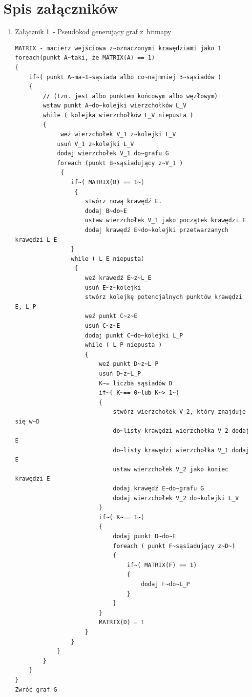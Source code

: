 \documentclass[a4paper,11pt,twoside,openright]{report}
\theoremstyle{definition}
\begin{document}
\chapter*{Spis załączników}
\begin{enumerate}
\item Załącznik 1~- Pseudokod generujący graf z~bitmapy

\begin{verbatim}
MATRIX - macierz wejściowa z~oznaczonymi krawędziami jako 1
foreach(punkt A~taki, że MATRIX(A) == 1)
{
    if~( punkt A~ma~1~sąsiada albo co~najmniej 3~sąsiadów )
    {
        // (tzn. jest albo punktem końcowym albo węzłowym)
        wstaw punkt A~do~kolejki wierzchołków L_V
        while ( kolejka wierzchołków L_V niepusta )
        {
             weź wierzchołek V_1 z~kolejki L_V
            usuń V_1 z~kolejki L_V
            dodaj wierzchołek V_1 do~grafu G
            foreach (punkt B~sąsiadujący z~V_1 )
             {
                if~( MATRIX(B) == 1~)
                 {
                    stwórz nową krawędź E.
                    dodaj B~do~E
                    ustaw wierzchołek V_1 jako początek krawędzi E
                    dodaj krawędź E~do~kolejki przetwarzanych krawędzi L_E
                }
                while ( L_E niepusta)
                 {
                    weź krawędź E~z~L_E
                    usuń E~z~kolejki
                    stwórz kolejkę potencjalnych punktów krawędzi E, L_P
                    weź punkt C~z~E
                    usuń C~z~E
                    dodaj punkt C~do~kolejki L_P
                    while ( L_P niepusta )
                    {
                        weź punkt D~z~L_P
                        usuń D~z~L_P
                        K~= liczba sąsiadów D
                        if~( K~== 0~lub K~> 1~)
                        {
                            stwórz wierzchołek V_2, który znajduje się w~D
                            do~listy krawędzi wierzchołka V_2 dodaj E
                            do~listy krawędzi wierzchołka V_1 dodaj E
                            ustaw wierzchołek V_2 jako koniec krawędzi E
                            dodaj krawędź E~do~grafu G
                            dodaj wierzchołek V_2 do~kolejki L_V
                        }
                        if~( K~== 1~)
                        {
                            dodaj punkt D~do~E
                            foreach ( punkt F~sąsiadujący z~D~)
                            {
                                if~( MATRIX(F) == 1)
                                {
                                    dodaj F~do~L_P
                                }
                            }
                        }
                        MATRIX(D) = 1
                    }
                }
            }
        }
    }
}
Zwróć graf G
\end{verbatim}


\end{enumerate}
\end{document}
